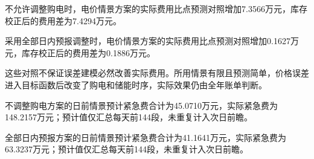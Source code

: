 不允许调整购电时，电价情景方案的实际费用比点预测对照增加7.3566万元，库存校正后的费用差为7.4294万元。

采用全部日内预报调整时，电价情景方案的实际费用比点预测对照增加0.1627万元，库存校正后的费用差为0.1886万元。

这些对照不保证误差建模必然改善实际费用。所用情景有限且预测简单，价格误差进入目标函数后改变了购电和储能时序，实际效果仍由全年账单判断。

不调整购电方案的日前情景预计紧急费合计为45.0710万元，实际紧急费为148.2157万元；预计值仅汇总每天前144段，未重复计入次日前瞻。

全部日内预报方案的日前情景预计紧急费合计为41.1641万元，实际紧急费为63.3237万元；预计值仅汇总每天前144段，未重复计入次日前瞻。

